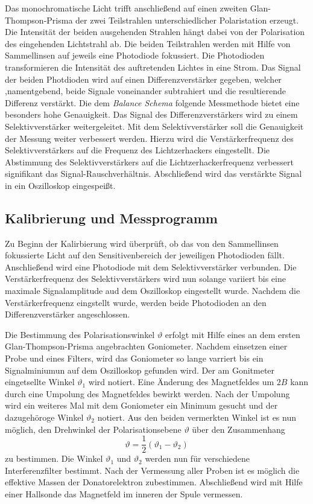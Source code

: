 Das monochromatische Licht trifft anschließend auf einen zweiten Glan-Thompson-Prisma
der zwei Teilstrahlen unterschiedlicher Polaristation erzeugt. Die Intensität
der beiden ausgehenden Strahlen hängt dabei von der Polarisation des eingehenden
Lichtstrahl ab. Die beiden Teilstrahlen werden mit Hilfe von Sammellinsen auf
jeweils eine Photodiode fokussiert. Die Photodioden transformieren die
Intensität des auftretenden Lichtes in eine Strom. Das Signal der beiden
Photdioden wird auf einen Differenzverstärker gegeben, welcher ,namentgebend,
beide Signale voneinander subtrahiert und die resultierende Differenz verstärkt.
Die dem \emph{Balance Schema} folgende Messmethode bietet eine besonders hohe Genauigkeit.
Das Signal des Differenzverstärkers wird zu einem Selektivverstärker weitergeleitet.
Mit dem Selektivverstärker soll die Genauigkeit der Messung weiter verbessert werden.
Hierzu wird die Verstärkerfrequenz des Selektivverstärkers auf die Frequenz des
Lichtzerhackers eingestellt. Die Abstimmung des Selektivverstärkers auf die
Lichtzerhackerfrequenz verbessert signifikant das Signal-Rauschverhältnis.
Abschließend wird das verstärkte Signal in ein Oszilloskop eingespeißt.

\subsection{Kalibrierung und Messprogramm}
Zu Beginn der Kalirbierung wird überprüft, ob das von den Sammellinsen
fokussierte Licht auf den Sensitivenbereich der jeweiligen Photodioden fällt.
Anschließend wird eine Photodiode mit dem Selektivverstärker verbunden.
Die Verstärkerfrequenz des Selektivverstärkers wird nun solange variiert
bis eine maximale Signalamplitude aud dem Oszilloskop eingestellt wurde.
Nachdem die Verstärkerfrequenz eingstellt wurde, werden beide Photodioden
an den Differenzverstärker angeschlossen.

Die Bestimmung des Polarisationswinkel $\vartheta$ erfolgt mit Hilfe eines
an dem ersten Glan-Thompson-Prisma angebrachten Goniometer. Nachdem einsetzen einer
Probe und eines Filters, wird das Goniometer so lange varriert bis ein Signalminiumun
auf dem Oszilloskop gefunden wird. Der am Gonitmeter eingetsellte Winkel $\vartheta_1$ wird
notiert. Eine Änderung des Magnetfeldes um $2B$ kann durch eine Umpolung des
Magnetfeldes bewirkt werden. Nach der Umpolung wird ein weiteres Mal mit dem
Goniometer ein Minimum gesucht und der dazugehöroge Winkel $\vartheta_2$ notiert.
Aus den beiden vermerkten Winkel ist es nun möglich, den Drehwinkel der Polarisationsebene
$\vartheta$ über den Zusammenhang
\begin{equation}
  \label{eq:theta_aus_messung}
  \vartheta = \frac{1}{2}(\vartheta_1 - \vartheta_2)
\end{equation}
zu bestimmen. Die Winkel $\vartheta_1$ und $\vartheta_2$ werden nun für verschiedene
Interferenzfilter bestimmt. Nach der Vermessung aller Proben ist es möglich die
effektive Massen der Donatorelektron zubestimmen.
Abschließend wird mit Hilfe einer Hallsonde das Magnetfeld im inneren der Spule
vermessen.
\FloatBarrier
